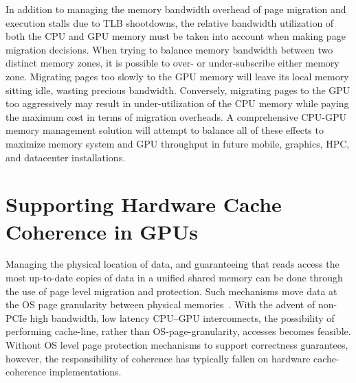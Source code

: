 In addition to managing the memory bandwidth overhead of page migration and
execution stalls due to TLB shootdowns, the relative bandwidth utilization of
both the CPU and GPU memory must be taken into account when making page
migration decisions.  When trying to balance memory bandwidth between two
distinct memory zones, it is possible to over- or under-subscribe either memory
zone. Migrating pages too slowly to the GPU memory will leave its local memory
sitting idle, wasting precious bandwidth.  Conversely, migrating pages to the
GPU too aggressively may result in under-utilization of the CPU memory while
paying the maximum cost in terms of migration overheads. A comprehensive CPU-GPU
memory management solution will attempt to balance all of these effects to
maximize memory system and GPU throughput in future mobile, graphics, HPC, and
datacenter installations.

\section{Supporting Hardware Cache Coherence in GPUs}

Managing the physical location of data, and guaranteeing that reads access the
most up-to-date copies of data in a unified shared memory can be done through
the use of page level migration and protection. Such mechanisms move data at the
OS page granularity between physical memories~\cite{UVM}.  With the advent of
non-PCIe high bandwidth, low latency CPU--GPU interconnects, the possibility of
performing cache-line, rather than OS-page-granularity, accesses becomes
feasible.  Without OS level page protection mechanisms to support correctness
guarantees, however,  the responsibility of coherence has typically fallen on
hardware cache-coherence implementations.

